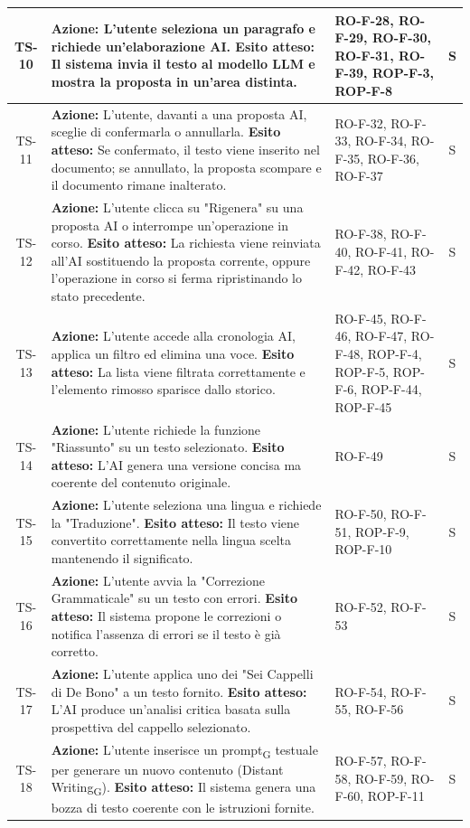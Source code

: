 \documentclass[11pt,a4paper]{article}
\newcommand{\gls}[1]{#1\textsubscript{G}}
\begin{document}
\begin{longtable}{|c|p{9cm}|p{3cm}|c|}
TS-10 & \textbf{Azione:} L'utente seleziona un paragrafo e richiede un'elaborazione AI. \newline \textbf{Esito atteso:} Il sistema invia il testo al modello LLM e mostra la proposta in un'area distinta. & RO-F-28, RO-F-29, RO-F-30, RO-F-31, RO-F-39, ROP-F-3, ROP-F-8 & S \\
\hline
TS-11 & \textbf{Azione:} L'utente, davanti a una proposta AI, sceglie di confermarla o annullarla. \newline \textbf{Esito atteso:} Se confermato, il testo viene inserito nel documento; se annullato, la proposta scompare e il documento rimane inalterato. & RO-F-32, RO-F-33, RO-F-34, RO-F-35, RO-F-36, RO-F-37 & S \\
\hline
TS-12 & \textbf{Azione:} L'utente clicca su "Rigenera" su una proposta AI o interrompe un'operazione in corso. \newline \textbf{Esito atteso:} La richiesta viene reinviata all'AI sostituendo la proposta corrente, oppure l'operazione in corso si ferma ripristinando lo stato precedente. & RO-F-38, RO-F-40, RO-F-41, RO-F-42, RO-F-43 & S \\
\hline
TS-13 & \textbf{Azione:} L'utente accede alla cronologia AI, applica un filtro ed elimina una voce. \newline \textbf{Esito atteso:} La lista viene filtrata correttamente e l'elemento rimosso sparisce dallo storico. & RO-F-45, RO-F-46, RO-F-47, RO-F-48, ROP-F-4, ROP-F-5, ROP-F-6, ROP-F-44, ROP-F-45 & S \\
\hline
TS-14 & \textbf{Azione:} L'utente richiede la funzione "Riassunto" su un testo selezionato. \newline \textbf{Esito atteso:} L'AI genera una versione concisa ma coerente del contenuto originale. & RO-F-49 & S
\\ \hline
TS-15 & \textbf{Azione:} L'utente seleziona una lingua e richiede la "Traduzione". \newline \textbf{Esito atteso:} Il testo viene convertito correttamente nella lingua scelta mantenendo il significato. & RO-F-50, RO-F-51, ROP-F-9, ROP-F-10 & S \\
\hline
TS-16 & \textbf{Azione:} L'utente avvia la "Correzione Grammaticale" su un testo con errori. \newline \textbf{Esito atteso:} Il sistema propone le correzioni o notifica l'assenza di errori se il testo è già corretto. & RO-F-52, RO-F-53 & S \\
\hline
TS-17 & \textbf{Azione:} L'utente applica uno dei "Sei Cappelli di De Bono" a un testo fornito. \newline \textbf{Esito atteso:} L'AI produce un'analisi critica basata sulla prospettiva del cappello selezionato. & RO-F-54, RO-F-55, RO-F-56 & S \\
\hline
TS-18 & \textbf{Azione:} L'utente inserisce un \gls{prompt} testuale per generare un nuovo contenuto (\gls{Distant Writing}). \newline \textbf{Esito atteso:} Il sistema genera una bozza di testo coerente con le istruzioni fornite. & RO-F-57, RO-F-58, RO-F-59, RO-F-60, ROP-F-11 & S \\ \hline


\end{longtable}
\end{document}
